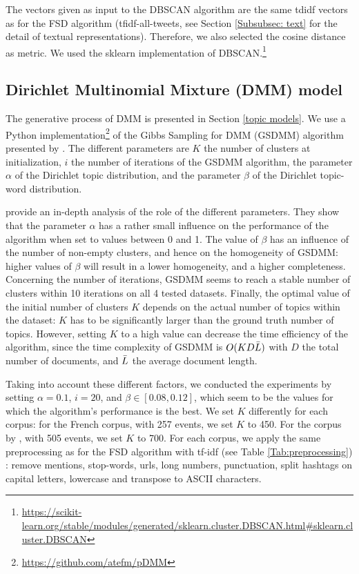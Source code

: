 The vectors given as input to the DBSCAN algorithm are the same tdidf vectors as for the FSD algorithm (tfidf-all-tweets, see Section \ref{Subsubsec: text} for the detail of textual representations). Therefore, we also selected the cosine distance as metric. We used the sklearn implementation of DBSCAN.\footnote{\url{https://scikit-learn.org/stable/modules/generated/sklearn.cluster.DBSCAN.html\#sklearn.cluster.DBSCAN}}

\subsection{Dirichlet Multinomial Mixture (DMM) model}
The generative process of DMM is presented in Section \ref{topic models}. We use a Python implementation\footnote{\url{https://github.com/atefm/pDMM}} of the Gibbs Sampling for DMM (GSDMM) algorithm presented by \citet{yin_dirichlet_2014}. The different parameters are $K$ the number of clusters at initialization, $i$ the number of iterations of the GSDMM algorithm, the parameter $\alpha$ of the Dirichlet topic distribution, and the parameter $\beta$ of the Dirichlet topic-word distribution.

\citet{yin_dirichlet_2014} provide an in-depth analysis of the role of the different parameters. They show that the parameter $\alpha$ has a rather small influence on the performance of the algorithm when set to values between 0 and 1. The value of $\beta$ has an influence of the number of non-empty clusters, and hence on the homogeneity of GSDMM: higher values of $\beta$ will result in a lower homogeneity, and a higher completeness. Concerning the number of iterations, GSDMM seems to reach a stable number of clusters within 10 iterations on all 4 tested datasets. Finally, the optimal value of the initial number of clusters $K$ depends on the actual number of topics within the dataset: $K$ has to be significantly larger than the ground truth number of topics. However, setting $K$ to a high value can decrease the time efficiency of the algorithm, since the time complexity of GSDMM is $O(KD\Bar{L})$ with $D$ the total number of documents, and $\Bar{L}$ the average document length.

Taking into account these different factors, we conducted the experiments by setting $\alpha=0.1$, $i=20$, and $\beta \in [0.08, 0.12]$, which seem to be the values for which the algorithm's performance is the best. We set $K$ differently for each corpus: for the French corpus, with 257 events, we set $K$ to 450. For the corpus by \citet{mcminn_building_2013}, with 505 events, we set $K$ to 700. For each corpus, we apply the same preprocessing as for the FSD algorithm with tf-idf (see Table \ref{Tab:preprocessing}) : remove mentions, stop-words, urls, long numbers, punctuation, split hashtags on capital letters, lowercase and transpose to ASCII characters.

